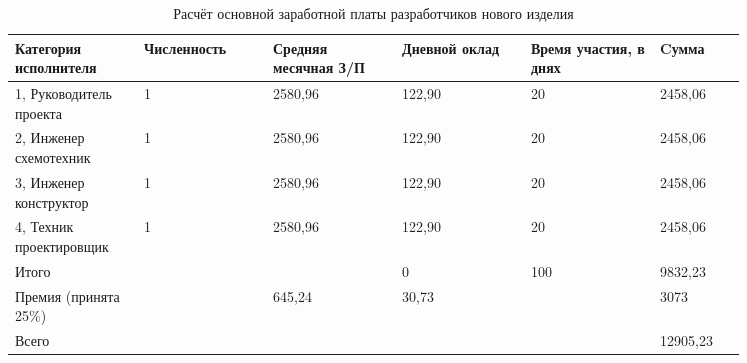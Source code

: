 \begin{table}[H]
  \small
  \caption{Расчёт основной заработной платы
    разработчиков нового изделия}
  \begin{tabular}{|p{0.15\linewidth}|p{0.15\linewidth}|p{0.15\linewidth}|p{0.15\linewidth}|p{0.15\linewidth}|p{0.1\linewidth}|}
    \hline
Категория исполнителя & Численность & Средняя месячная З/П & Дневной оклад & Время участия, в днях & Cумма\\[0pt]
\hline
    1, Руководитель проекта & 1 & 2580,96 & 122,90 & 20 & 2458,06\\[0pt]
    \hline
    2, Инженер схемотехник & 1 & 2580,96 & 122,90 & 20 & 2458,06\\[0pt]
    \hline
    3, Инженер конструктор & 1 & 2580,96 & 122,90 & 20 & 2458,06\\[0pt]
    \hline
    4, Техник проектировщик & 1 & 2580,96 & 122,90 & 20 & 2458,06\\[0pt]
    \hline
    Итого &  &  & 0 & 100 & 9832,23\\[0pt]
    \hline
    Премия (принята 25\%) &  & 645,24 & 30,73 &  & 3073 \\[0pt]
    \hline
    Всего &  &  &   &  & 12905,23\\[0pt]
    \hline
\end{tabular}
\end{table}

